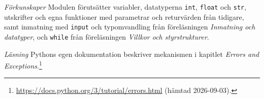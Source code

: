 \emph{Förkunskaper}
Modulen förutsätter variabler, datatyperna \texttt{int},
\texttt{float} och \texttt{str}, utskrifter och
egna funktioner med parametrar och returvärden från tidigare, samt
inmatning med \texttt{input} och typomvandling från
föreläsningen \emph{Inmatning och datatyper}, och
\texttt{while} från föreläsningen \emph{Villkor och
styrstrukturer}.

\emph{Läsning}
Pythons egen dokumentation beskriver mekanismen i kapitlet \emph{Errors
and Exceptions}.\footnote{\label{fn:pydoc}%
  \url{https://docs.python.org/3/tutorial/errors.html} (hämtad
  2026-09-03).}
